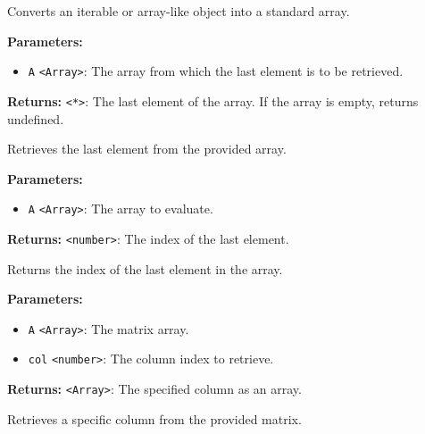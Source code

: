 \documentclass[12pt,a4paper]{article}
\begin{document}
\noindent Converts an iterable or array-like object into a standard array.

\vspace{5mm}
\noindent {}


\noindent \textbf{Parameters:}
\begin{itemize}
  \item \texttt{A} \texttt{<Array>}: The array from which the last element is to be retrieved.
\end{itemize}

\noindent \textbf{Returns:} \texttt{<*>}: The last element of the array. If the array is empty, returns undefined.

\noindent Retrieves the last element from the provided array.

\vspace{5mm}
\noindent {}


\noindent \textbf{Parameters:}
\begin{itemize}
  \item \texttt{A} \texttt{<Array>}: The array to evaluate.
\end{itemize}

\noindent \textbf{Returns:} \texttt{<number>}: The index of the last element.

\noindent Returns the index of the last element in the array.

\vspace{5mm}
\noindent {}


\noindent \textbf{Parameters:}
\begin{itemize}
  \item \texttt{A} \texttt{<Array>}: The matrix array.
  \item \texttt{col} \texttt{<number>}: The column index to retrieve.
\end{itemize}

\noindent \textbf{Returns:} \texttt{<Array>}: The specified column as an array.

\noindent Retrieves a specific column from the provided matrix.
\end{document}
